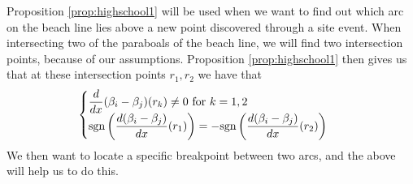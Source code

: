 Proposition \ref{prop:highschool1} will be used when we want to find out which arc on the beach line lies above a new point discovered through a site event. When intersecting two of the paraboals of the beach line, we will find two intersection points, because of our assumptions. Proposition \ref{prop:highschool1} then gives us that at these intersection points $r_1, r_2$ we have that
\[
    \begin{cases}
        \displaystyle\frac{d}{dx}(\beta_i - \beta_j)(r_k) \ne 0 \text{ for } k = 1, 2 & \text{ } \\
        \text{sgn} \left(\displaystyle\frac{d(\beta_i - \beta_j)}{dx}(r_1)\right) = -\text{sgn} \left(\displaystyle\frac{d(\beta_i - \beta_j)}{dx}(r_2)\right) & \text{ }
    \end{cases}
\]
We then want to locate a specific breakpoint between two arcs, and the above will help us to do this.

